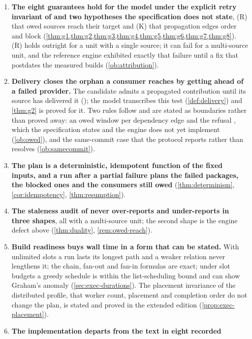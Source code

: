 \begin{enumerate}[leftmargin=2em]
  \item \textbf{The eight guarantees hold for the model under the explicit
    retry invariant of  and two hypotheses the specification does
    not state}, (R) that owed sources reach their target and (K) that
    propagation edges order and block (\cref{thm:g1,thm:g2,thm:g3,thm:g4,thm:g5,thm:g6,thm:g7,thm:g8}).
    (R) holds outright for a unit with a single source; it can fail for a
    multi-source unit, and the reference engine exhibited exactly that failure
    until a fix that postdates the measured builds (\cref{ob:attribution}).
  \item \textbf{Delivery closes the orphan a consumer reaches by getting ahead
    of a failed provider.} The candidate admits a propagated contribution
    until its source has delivered it (); the model transcribes
    this test (\cref{def:delivery}) and \cref{thm:g2} is proved for it. Two
    rules follow and are stated as boundaries rather than proved away: an owed
    window per dependency edge and the refusal , which the
    specification states and the engine does not yet implement
    (\cref{ob:owed}), and the same-commit case that the protocol reports
    rather than resolves (\cref{ob:samecommit}).
  \item \textbf{The plan is a deterministic, idempotent function of the fixed
    inputs, and a run after a partial failure plans the failed packages, the
    blocked ones and the consumers still owed} (\cref{thm:determinism},
    \cref{cor:idempotency}, \cref{thm:resumption}).
  \item \textbf{The staleness audit of  never over-reports and
    under-reports in three shapes}, all with a multi-source unit; the second
    shape is the engine defect above (\cref{thm:duality}, \cref{rem:owed-reach}).
  \item \textbf{Build readiness buys wall time in a form that can be stated.}
    With unlimited slots a run lasts its longest path and a weaker relation
    never lengthens it; the chain, fan-out and fan-in formulas are exact; under
    slot budgets a greedy schedule is within the list-scheduling bound and can
    show Graham's anomaly (\cref{sec:exec-durations}). The placement invariance
    of the distributed profile, that worker count, placement and completion
    order do not change the plan, is stated and proved in the extended edition
    (\cref{prop:exec-placement}).
  \item \textbf{The implementation departs from the text in eight recorded
}
\end{enumerate}
